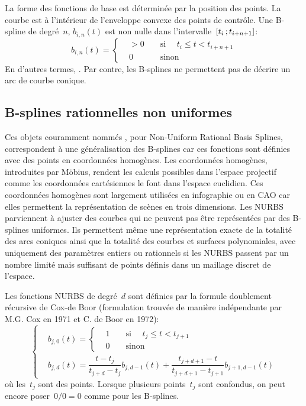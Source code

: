 La forme des fonctions de base est déterminée par la position des points. La courbe est à l'intérieur de l'enveloppe convexe des points de contrôle. Une B-spline de degré~$n$, $b_{i,n}(t)$ est non nulle dans l'intervalle~$\mathopen{[}t_i\,;t_{i+n+1}\mathclose{]}$: 
\begin{equation}
b_{i,n}(t) =\left\{\begin{aligned}
&>0 && \text{ si } \quad t_{i} \leqslant t < t_{i+n+1} \\
&0 && \text{ sinon } 
\end{aligned}\right. 
\end{equation}
En d'autres termes, . Par contre, les B-splines ne permettent pas de décrire un arc de courbe conique. 
\subsection{B-splines rationnelles non uniformes} 
Ces objets couramment nommés , pour Non-Uniform Rational Basis Splines, correspondent à une généralisation des B-splines car ces fonctions sont définies avec des points en coordonnées homogènes. Les coordonnées homogènes, introduites par Möbius, rendent les calculs possibles dans l'espace projectif comme les coordonnées cartésiennes le font dans l'espace euclidien. Ces coordonnées homogènes sont largement utilisées en infographie ou en CAO car elles permettent la représentation de scènes en trois dimensions. Les NURBS parviennent à ajuster des courbes qui ne peuvent pas être représentées par des B-splines uniformes. Ils permettent même une représentation exacte de la totalité des arcs coniques ainsi que la totalité des courbes et surfaces polynomiales, avec uniquement des paramètres entiers ou rationnels si les NURBS passent par un nombre limité mais suffisant de points définis dans un maillage discret de l'espace. 

Les fonctions NURBS de degré~$d$ sont définies par la formule doublement récursive de Cox-de Boor (formulation trouvée de manière indépendante par M.G. Cox en 1971 et C. de Boor en 1972): 
\begin{equation}
\left\{\begin{aligned}
&b_{j,0}(t)=
\left\{\begin{aligned}
& 1 && \text{ si }\quad t_j \leq t < t_{j+1} \\
& 0 && \text{ sinon } 
\end{aligned}\right.\\ 
&b_{j,d}(t)= \dfrac{t-t_j}{t_{j+d}-t_j} b_{j,d-1}(t)+\dfrac{t_{j+d+1}-t}{t_{j+d+1}-t_{j+1}}b_{j+1,d-1}(t)
\end{aligned}\right. 
\end{equation}
où les~$t_j$ sont des points. Lorsque plusieurs points~$t_j$ sont confondus, on peut encore poser~$0/0=0$ comme pour les B-splines. 